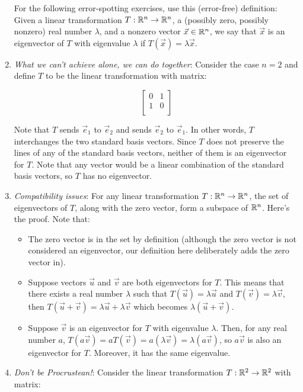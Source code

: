 \documentclass[10pt]{amsart}
\begin{document}
\begin{enumerate}
  \vspace{0.5in}

  For the following error-spotting exercises, use this (error-free)
  definition: Given a linear transformation $T:\mathbb{R}^n \to \mathbb{R}^n$, a
  (possibly zero, possibly nonzero) real number $\lambda$, and a
  nonzero vector $\vec{x} \in \mathbb{R}^n$, we say that $\vec{x}$ is an
  eigenvector of $T$ with eigenvalue $\lambda$ if $T(\vec{x}) =
  \lambda \vec{x}$.

\item {\em What we can't achieve alone, we can do together}: Consider
  the case $n = 2$ and define $T$ to be the linear transformation with
  matrix:

  $$\left[\begin{matrix} 0 & 1 \\ 1 & 0 \\\end{matrix}\right]$$

  Note that $T$ sends $\vec{e}_1$ to $\vec{e}_2$ and sends $\vec{e}_2$
  to $\vec{e}_1$. In other words, $T$ interchanges the two standard
  basis vectors. Since $T$ does not preserve the lines of any of the
  standard basis vectors, neither of them is an eigenvector for
  $T$. Note that any vector would be a linear combination of the
  standard basis vectors, so $T$ has no eigenvector.

\item {\em Compatibility issues}: For any linear transformation
  $T:\mathbb{R}^n \to \mathbb{R}^n$, the set of eigenvectors of $T$, along with the
  zero vector, form a subspace of $\mathbb{R}^n$. Here's the proof. Note that:

  \begin{itemize}
  \item The zero vector is in the set by definition (although the zero
    vector is not considered an eigenvector, our definition here
    deliberately adds the zero vector in).
  \item Suppose vectors $\vec{u}$ and $\vec{v}$ are both eigenvectors
    for $T$. This means that there exists a real number $\lambda$ such
    that $T(\vec{u}) = \lambda \vec{u}$ and $T(\vec{v}) = \lambda
    \vec{v}$, then $T(\vec{u} + \vec{v}) = \lambda\vec{u} + \lambda
    \vec{v}$ which becomes $\lambda(\vec{u} + \vec{v})$.
  \item Suppose $\vec{v}$ is an eigenvector for $T$ with eigenvalue
    $\lambda$. Then, for any real number $a$, $T(a\vec{v}) =
    aT(\vec{v}) = a(\lambda \vec{v}) = \lambda(a \vec{v})$, so
    $a\vec{v}$ is also an eigenvector for $T$. Moreover, it has the
    same eigenvalue.
  \end{itemize}
\item {\em Don't be Procrustean!}: Consider the linear transformation
  $T:\mathbb{R}^2 \to \mathbb{R}^2$ with matrix:


\end{enumerate}
\end{document}
